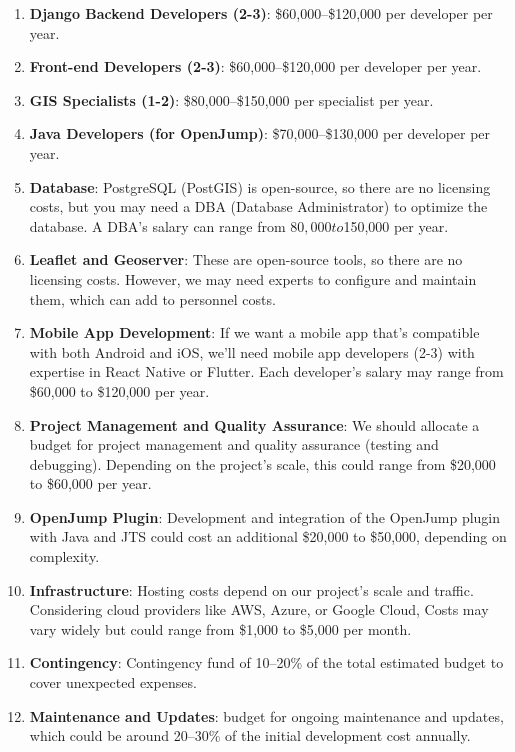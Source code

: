 \begin{enumerate}
    \item \textbf{Django Backend Developers (2-3)}: \$60,000--\$120,000 per developer per year.

    \item \textbf{Front-end Developers (2-3)}: \$60,000--\$120,000 per developer per year.

    \item \textbf{GIS Specialists (1-2)}: \$80,000--\$150,000 per specialist per year.

    \item \textbf{Java Developers (for OpenJump)}: \$70,000--\$130,000 per developer per year.

    \item \textbf{Database}: PostgreSQL (PostGIS) is open-source, so there are no licensing costs, but you may need a DBA (Database Administrator) to optimize the database. A DBA's salary can range from $80,000 to $150,000 per year.

    \item \textbf{Leaflet and Geoserver}: These are open-source tools, so there are no licensing costs.
    However, we may need experts to configure and maintain them, which can add to personnel costs.

    \item \textbf{Mobile App Development}: If we want a mobile app that's compatible with both Android and iOS, we'll need mobile app developers (2-3) with expertise in React Native or Flutter.
    Each developer's salary may range from \$60,000 to \$120,000 per year.

    \item \textbf{Project Management and Quality Assurance}: We should allocate a budget for project management and quality assurance (testing and debugging).
    Depending on the project's scale, this could range from \$20,000 to \$60,000 per year.

    \item \textbf{OpenJump Plugin}: Development and integration of the OpenJump plugin with Java and JTS could cost an additional \$20,000 to \$50,000, depending on complexity.

    \item \textbf{Infrastructure}: Hosting costs depend on our project's scale and traffic.
    Considering cloud providers like AWS, Azure, or Google Cloud, Costs may vary widely but could range from \$1,000 to \$5,000 per month.

    \item \textbf{Contingency}: Contingency fund of 10--20\% of the total estimated budget to cover unexpected expenses.

    \item \textbf{Maintenance and Updates}: budget for ongoing maintenance and updates, which could be around 20--30\% of the initial development cost annually.

\end{enumerate}

